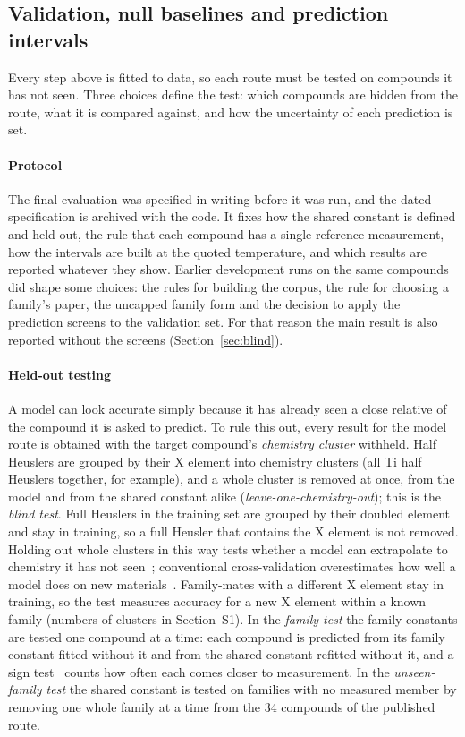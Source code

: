 \subsection{Validation, null baselines and prediction intervals}
\label{sec:nulls}
\label{sec:intervals}

Every step above is fitted to data, so each route must be tested on compounds it has not seen. Three
choices define the test: which compounds are hidden from the route, what it is compared against, and
how the uncertainty of each prediction is set.

\paragraph{Protocol} The final evaluation was specified in writing before it was run, and the dated
specification is archived with the code. It fixes how the shared constant is defined and held out,
the rule that each compound has a single reference measurement, how the intervals are built at the
quoted temperature, and which results are reported whatever they show. Earlier development runs on
the same compounds did shape some choices: the rules for building the corpus, the rule for choosing a
family's paper, the uncapped family form and the decision to apply the prediction screens to the
validation set. For that reason the main result is also reported without the screens
(Section~\ref{sec:blind}).

\paragraph{Held-out testing} A model can look accurate simply because it has already seen a close
relative of the compound it is asked to predict. To rule this out, every result for the model route
is obtained with the target compound's \emph{chemistry cluster} withheld. Half Heuslers are grouped by
their X element into chemistry clusters (all Ti half Heuslers together, for example), and a whole
cluster is removed at once, from the model and from the shared constant alike
(\emph{leave-one-chemistry-out}); this is the \emph{blind test}. Full Heuslers in the training set are
grouped by their doubled element and stay in training, so a full Heusler that contains the X element
is not removed. Holding out
whole clusters in this way tests whether a model can extrapolate to chemistry it has not
seen~\cite{durdy2022random}; conventional cross-validation overestimates how well a model does on
new materials~\cite{meredig2018can}. Family-mates with a different X element stay in training, so
the test measures accuracy for a new X element within a known family (numbers of clusters in Section~S1).
In the \emph{family test} the family constants are tested one compound at a time: each compound is
predicted from its family
constant fitted without it and from the shared constant refitted without it, and a sign
test~\cite{dixon1946the} counts how often each comes closer to measurement. In the \emph{unseen-family test} the shared constant is tested on families with no measured member
by removing one whole family at a time from the \num{34} compounds of the published route.

